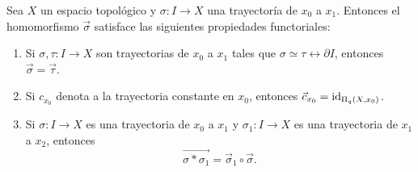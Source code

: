     \begin{prop}
    Sea $X$ un espacio topológico y $\sigma:I\to X$ una trayectoría de $x_0$ a $x_1$. Entonces el homomorfismo $\vec{\sigma}$ satisface las siguientes propiedades functoriales:
    \begin{enumerate}
        \item[(1)] Si $\sigma, \tau: I \to X$ son trayectorias de $x_0$ a $x_1$ tales que $\sigma \simeq \tau \rel \partial I$, entonces $\vec{\sigma} = \vec{\tau}$.
        \item[(2)] Si $c_{x_0}$ denota a la trayectoria constante en $x_0$, entonces $\vec{c}_{x_0} = \mathrm{id}_{\Pi_q(X, x_0)}$.
        \item[(3)] Si $\sigma: I \to X$ es una trayectoria de $x_0$ a $x_1$ y $\sigma_1: I \to X$ es una trayectoria de $x_1$ a $x_2$, entonces 
        \[
            \overrightarrow{\sigma * \sigma_1} = \vec{\sigma}_1 \circ \vec{\sigma}.
        \]
    \end{enumerate}
\end{prop}

